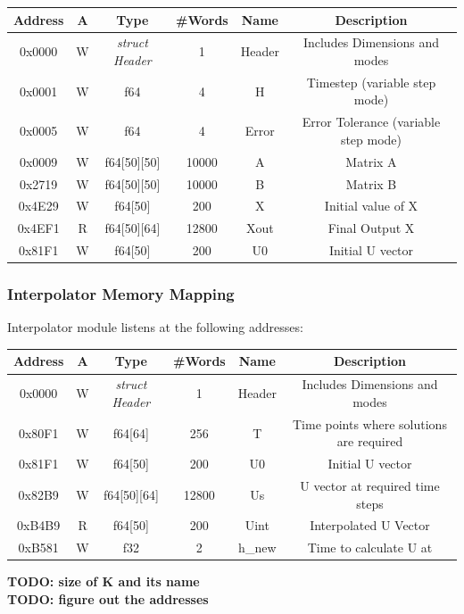 \documentclass[12pt]{extarticle}
\begin{document}
\begin{center}
 \begin{tabular}{||c c c c c c||} 
 \hline
 Address & A & Type & \#Words & Name & Description  \\ [0.5ex] 
 \hline\hline
  0x0000 & W & \emph{struct Header} & 1 & Header & Includes Dimensions and modes  \\ 
 \hline
 0x0001  & W & f64 & 4 & H & Timestep (variable step mode)  \\
 \hline
 0x0005  & W & f64 & 4 & Error & Error Tolerance (variable step mode) \\
 \hline
 0x0009  & W & f64[50][50] & 10000 & A & Matrix A \\
 \hline
 0x2719  & W & f64[50][50] & 10000 & B & Matrix B \\
 \hline
 0x4E29  & W & f64[50] & 200 & X & Initial value of X \\
 \hline
 0x4EF1  & R & f64[50][64] & 12800 & Xout & Final Output X \\ [1ex] 
 \hline
 \hline
 0x81F1  & W & f64[50] & 200 & U0 & Initial U vector \\
 \hline
\end{tabular}
\end{center}

\subsubsection{Interpolator Memory Mapping}
Interpolator module listens at the following addresses:

\begin{center}
 \begin{tabular}{||c c c c c c||} 
 \hline
 Address & A & Type & \#Words & Name & Description  \\ [0.5ex] 
 \hline\hline
  0x0000 & W & \emph{struct Header} & 1 & Header & Includes Dimensions and modes  \\ 
 \hline
 0x80F1  & W & f64[64] & 256 & T & Time points where solutions are required  \\
 \hline
 0x81F1  & W & f64[50] & 200 & U0 & Initial U vector \\
 \hline
 0x82B9  & W & f64[50][64] & 12800 & Us & U vector at required time steps \\
 \hline
 0xB4B9  & R & f64[50] & 200 & Uint & Interpolated U Vector \\
 \hline
 0xB581  & W & f32 & 2 & h_new & Time to calculate U at \\ [1ex] 
 \hline
\end{tabular}
\end{center}
\textbf{TODO: size of K and its name} \\
\textbf{TODO: figure out the addresses}
\end{document}
